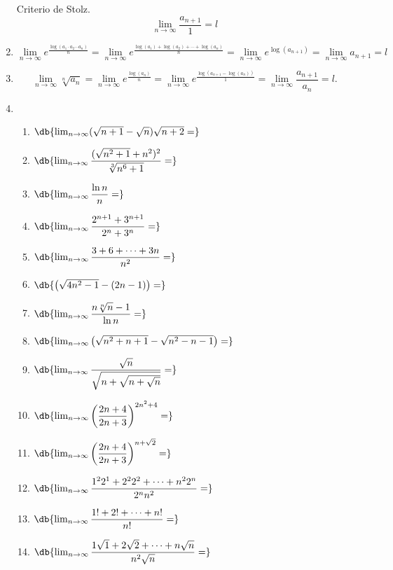 \begin{enumerate}[label=\color{red}\textbf{\arabic*)}, leftmargin=*]
Criterio de Stolz. \[ \lim_{n\to\infty}\dfrac{a_{n+1}}{1}=l \]
\item {}
\[ \lim_{n\to\infty}e^{\frac{\log(a_1\cdot a_2\cdots a_n)}{n}}=\lim_{n\to\infty}e^{\frac{\log(a_1)+\log(a_2)+\cdots+\log(a_n)}{n}}=\lim_{n\to\infty}e^{\log(a_{n+1})}=\lim_{n\to\infty}a_{n+1}=l \]
\item {}
\[ \lim_{n\to\infty}\sqrt[n]{a_n}=\lim_{n\to\infty}e^{\frac{\log(a_n)}{n}}=\lim_{n\to\infty}e^{\frac{\log(a_{n+1}-\log(a_n))}{1}}=\lim_{n\to\infty}\dfrac{a_{n+1}}{a_n}=l. \]
\item {}
\begin{enumerate}[label=\color{red}\arabic*)]
	\item $\db{\lim_{n\to\infty}(\sqrt{n+1}-\sqrt{n})\sqrt{n+2}=}$
	\item $\db{\lim_{n\to\infty}\dfrac{(\sqrt{n^2+1}+n^2)^2}{\sqrt[3]{n^6+1}}=}$
	\item $\db{\lim_{n\to\infty}\dfrac{\ln n}{n}=}$
	\item $\db{\lim_{n\to\infty}\dfrac{2^{n+1}+3^{n+1}}{2^n+3^n}=}$
	\item $\db{\lim_{n\to\infty}\dfrac{3+6+\cdots+3n}{n^2}=}$
	\item $\db{\left(\sqrt{4n^2-1}-(2n-1)\right)=}$
	\item $\db{\lim_{n\to\infty}\dfrac{n\sqrt[n]{n}-1}{\ln n}=}$
	\item $\db{\lim_{n\to\infty}\left(\sqrt{n^2+n+1}-\sqrt{n^2-n-1}\right)=}$
	\item $\db{\lim_{n\to\infty}\dfrac{\sqrt{n}}{\sqrt{n+\sqrt{n+\sqrt{n}}}}=}$
	\item $\db{\lim_{n\to\infty}\left(\dfrac{2n+4}{2n+3}\right)^{2n^2+4}=}$
	\item $\db{\lim_{n\to\infty}\left(\dfrac{2n+4}{2n+3}\right)^{n+\sqrt{2}}=}$
	\item $\db{\lim_{n\to\infty}\dfrac{1^22^1+2^22^2+\cdots+n^22^n}{2^nn^2}=}$
	\item $\db{\lim_{n\to\infty}\dfrac{1!+2!+\cdots+n!}{n!}=}$
	\item $\db{\lim_{n\to\infty}\dfrac{1\sqrt{1}+2\sqrt{2}+\cdots+n\sqrt{n}}{n^2\sqrt{n}}=}$

\end{enumerate}
\end{enumerate}
